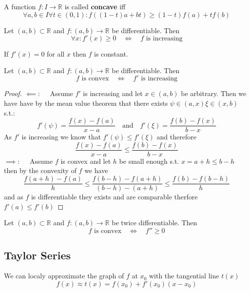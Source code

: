 \begin{definition}
    A function $f: I \to \mathbb{R}$ is called \textbf{concave} iff 
    $$\forall a, b \in I \forall t \in (0, 1) : f((1-t)a + bt) \geq (1-t) f(a) + t f(b)$$
\end{definition}

\begin{theorem}
    Let $(a, b) \subset \mathbb{R}$ and $f: (a, b) \to \mathbb{R}$ be differentiable. Then 
    $$\forall x: f'(x) \geq 0 \quad \iff \quad f \text{ is increasing}$$
\end{theorem}

\begin{remark}
    If $f'(x) = 0$ for all $x$ then $f$ is constant.
\end{remark}

\begin{theorem}
    Let $(a, b) \subset \mathbb{R}$ and $f: (a, b) \to \mathbb{R}$ be differentiable. Then 
    $$f \text{ is convex} \quad \iff \quad f' \text{ is increasing}$$
\end{theorem}

\begin{proof}
    $\impliedby: \quad$ Assume $f'$ is increasing and let $x \in (a, b)$ be arbitrary. Then we have have by the mean value theorem that there exists $\psi \in (a, x) \xi \in (x, b)$ s.t.:
    $$f'(\psi) = \frac{f(x)-f(a)}{x-a} \quad \text{and} \quad f'(\xi) = \frac{f(b)-f(x)}{b-x}$$
    As $f'$ is increasing we know that $f'(\psi) \leq f'(\xi)$ and therefore
    $$\frac{f(x)-f(a)}{x-a} \leq \frac{f(b)-f(x)}{b-x}$$
    $\implies: \quad$ Assume $f$ is convex and let $h$ be small enough s.t. $x = a 
    + h \leq b-h$ then by the convexity of $f$ we have
    $$\frac{f(a+h)-f(a)}{h} \leq \frac{f(b-h)-f(a+h)}{(b-h) - (a+h)} \leq \frac{f(b)-f(b-h)}{h}$$
    and as $f$ is differentiable they exists and are comparable therfore $f'(a) \leq f'(b)$
\end{proof}

\begin{theorem}
    Let $(a, b) \subset \mathbb{R}$ and $f: (a, b) \to \mathbb{R}$ be twice differentiable. Then 
    $$f \text{ is convex} \quad \iff \quad f'' \geq 0$$
\end{theorem}

\subsection{Taylor Series}

\begin{lemma}
    We can localy approximate the graph of $f$ at $x_0$ with the tangential line $t(x)$
    $$f(x) \approx t(x) = f(x_0) + f'(x_0)(x-x_0)$$
\end{lemma}

